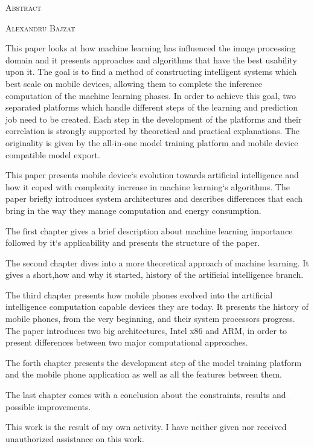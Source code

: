 \documentclass[12pt,a4paper]{report}
\begin{document}
		\begin{center}
			\vspace{0.5cm}
			\Large \textsc{Abstract}
		\end{center}
	\hfill \textsc{Alexandru Bajzat}
	\vspace{1.5cm}
	
	
	
	This paper looks at how machine learning has influenced the image processing domain and it presents approaches and algorithms that have the best usability upon it. The goal is to find a method of constructing intelligent systems which best scale on mobile devices, allowing them to complete the inference computation of the machine learning phases. In order to achieve this goal, two separated platforms which handle different steps of the learning and prediction job need to be created. Each step in the development of the platforms and their correlation is strongly supported by theoretical and practical explanations. The originality is given by the all-in-one model training platform and mobile device compatible model export.
	
	This paper presents mobile device`s evolution towards artificial intelligence and how it coped with complexity increase in machine learning`s algorithms. 
	The paper briefly introduces system architectures and describes differences that each bring in the way they manage computation and energy consumption.
	
	The first chapter gives a brief description about machine learning importance followed by it`s applicability and presents the structure of the paper.
	
	The second chapter dives into a more theoretical approach of machine learning. It gives a short,how and why it started, history of the artificial intelligence branch. 
	
	The third chapter presents how mobile phones evolved into the artificial intelligence computation capable devices they are today. It presents the history of mobile phones, from the very beginning, and their system processors progress. The paper introduces two big architectures, Intel x86 and ARM, in order to present differences between two major computational approaches.
	
	The forth chapter presents the development step of the model training platform and the mobile phone application as well as all the features between them.
	
	The last chapter comes with a conclusion about the constraints, results and possible improvements.
	
	This work is the result of my own activity. I have neither given nor received unauthorized assistance on
	this work.
\end{document}
